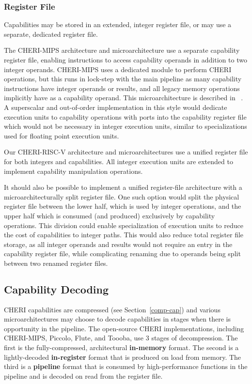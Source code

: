 \subsubsection{Register File}
Capabilities may be stored in an extended, integer register file, or may use a separate, dedicated register file.

The CHERI-MIPS architecture and microarchitecture use a separate capability register file, enabling instructions to access capability operands in addition to two integer operands.
CHERI-MIPS uses a dedicated module to perform CHERI operations, but this runs in lock-step with the main pipeline as many capability instructions have integer operands or results, and all legacy memory operations implicitly have \DDC{} as a capability operand.
This microarchitecture is described in ~\cite{woodruff:cheriisca2014}.
A superscalar and out-of-order implementation in this style would dedicate execution units to capability operations with ports into the capability register file which would not be necessary in integer execution units, similar to specializations used for floating point execution units.

Our CHERI-RISC-V architecture and microarchitectures use a unified register file for both integers and capabilities.
All integer execution units are extended to implement capability manipulation operations.

It should also be possible to implement a unified register-file architecture with a microarchitecturally split register file.
One such option would split the physical register file between the lower half, which is used by integer operations, and the upper half which is consumed (and produced) exclusively by capability operations.
This division could enable specialization of execution units to reduce the cost of capabilities to integer paths.
This would also reduce total register file storage, as all integer operands and results would not require an entry in the capability register file, while complicating renaming due to operands being split between two renamed register files.

\subsection{Capability Decoding}

CHERI capabilities are compressed (see Section~\ref{comp-cap}) and various microarchitectures may choose to decode
capabilities in stages when there is opportunity in the pipeline.
The open-source CHERI implementations, including CHERI-MIPS, Piccolo, Flute, and Toooba,
use 3 stages of decompression.
The first is the fully-compressed, architectural \textbf{in-memory} format.
The second is a lightly-decoded \textbf{in-register} format that is produced on load from memory.
The third is a \textbf{pipeline} format that is consumed by high-performance functions in the pipeline and is decoded on read from the register file.

